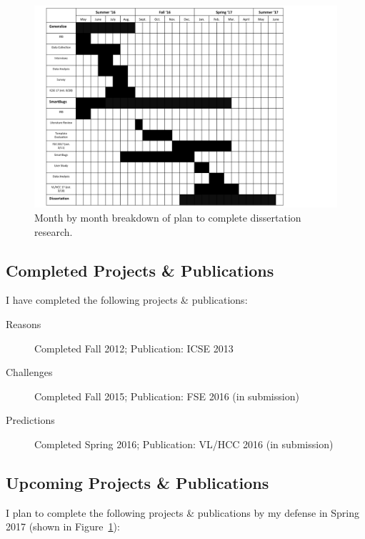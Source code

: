 \documentclass{llncs}
\begin{document}
\begin{figure} 
	\centering
	\includegraphics[width=5in]{figs/project-schedule.pdf}
	\caption{Month by month breakdown of plan to complete dissertation research.}
	\label{fig:plan}
\end{figure}

\subsection{Completed Projects \& Publications}

I have completed the following projects \& publications:
\begin{description}
	\item[Reasons] Completed Fall 2012; Publication: ICSE 2013
	\item[Challenges] Completed Fall 2015; Publication: FSE 2016 (in submission)
	\item[Predictions] Completed Spring 2016; Publication: VL/HCC 2016 (in submission)
\end{description}

\subsection{Upcoming Projects \& Publications}

I plan to complete the following projects \& publications by my defense in Spring 2017 (shown in Figure~\ref{fig:plan}):
\end{document}
